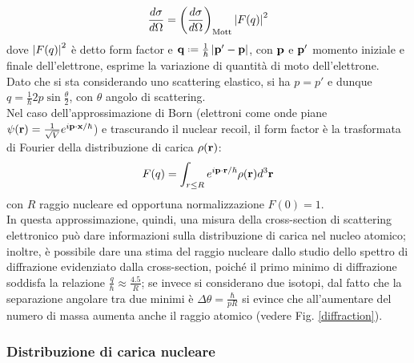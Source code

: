 \begin{equation}
	\frac{d\sigma}{d\Omega} = \left(\frac{d\sigma}{d\Omega}\right)_{\text{Mott}} \left\lvert F(q)\right\rvert^2
	\label{eq:12}
\end{equation}
dove $ \left\lvert F(q)\right\rvert^2 $ è detto form factor e $ \ve{q} \defeq \frac{1}{\hbar} \abs{\ve{p}' - \ve{p}} $, con $ \mathbf{p} $ e $ \mathbf{p}' $ momento iniziale e finale dell'elettrone, esprime la variazione di quantità di moto dell'elettrone.\\
Dato che si sta considerando uno scattering elastico, si ha $ p = p' $ e dunque $ q = \frac{1}{\hbar} 2p \sin \frac{\theta}{2} $, con $ \theta $ angolo di scattering.\\
Nel caso dell'approssimazione di Born (elettroni come onde piane $ \psi(\mathbf{r}) = \frac{1}{\sqrt{V}} e^{i \mathbf{p}\cdot\mathbf{x} / \hbar} $) e trascurando il nuclear recoil, il form factor è la trasformata di Fourier della distribuzione di carica $ \rho(\mathbf{r}) $:
\begin{equation}
	F(q) = \int_{r \le R} e^{i \mathbf{p}\cdot\mathbf{r} / \hbar} \rho(\mathbf{r}) d^3\mathbf{r}
	\label{eq:13}
\end{equation}
con $ R $ raggio nucleare ed opportuna normalizzazione $ F(0) = 1 $.\\
In questa approssimazione, quindi, una misura della cross-section di scattering elettronico può dare informazioni sulla distribuzione di carica nel nucleo atomico; inoltre, è possibile dare una stima del raggio nucleare dallo studio dello spettro di diffrazione evidenziato dalla cross-section, poiché il primo minimo di diffrazione soddisfa la relazione $ \frac{q}{\hbar} \approx \frac{4.5}{R} $; se invece si considerano due isotopi, dal fatto che la separazione angolare tra due minimi è $ \Delta\theta = \frac{\hbar}{p R} $ si evince che all'aumentare del numero di massa aumenta anche il raggio atomico (vedere Fig. \ref{diffraction}).

\subsubsection{Distribuzione di carica nucleare}

